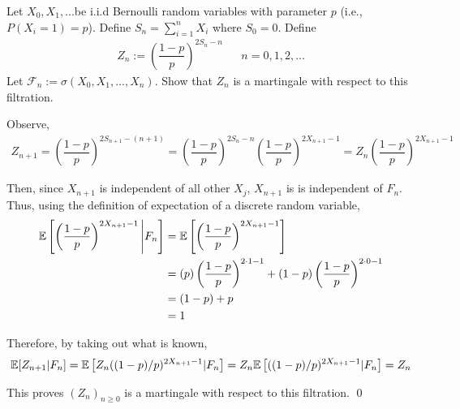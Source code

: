\documentclass[10pt]{article}
\begin{document}
\begin{problem}[Exercise 2.5]
Let \( X_0,X_1,... \)be i.i.d Bernoulli random variables with parameter \( p \) (i.e., \( P(X_i= 1) =p\)). Define \( S_n=\sum_{i=1}^{n}X_i \) where \( S_0=0 \). Define
\begin{align*}
    Z_n:=\left(\dfrac{1-p}{p}\right)^{2S_n-n} && n=0,1,2,...
\end{align*}
Let \( \mathcal{F}_n:=\sigma(X_0,X_1,...,X_n) \). Show that \( Z_n \) is a martingale with respect to this filtration.
\end{problem}

\begin{solution}[Solution]
Observe,
\begin{align*}
    Z_{n+1} = \left(\dfrac{1-p}{p}\right)^{2S_{n+1}-(n+1)} = \left(\dfrac{1-p}{p}\right)^{2S_n-n}\left(\dfrac{1-p}{p}\right)^{2X_{n+1}-1} = Z_n\left(\dfrac{1-p}{p}\right)^{2X_{n+1}-1} 
\end{align*}

Then, since \( X_{n+1} \) is independent of all other \( X_j \), \( X_{n+1} \) is is independent of \( F_n \). Thus, using the definition of expectation of a discrete random variable,
\begin{align*}
    \mathbb{E}\left[\left(\dfrac{1-p}{p}\right)^{2X_{n+1}-1} \Bigg| F_n \right] &= \mathbb{E}\left[\left(\dfrac{1-p}{p}\right)^{2X_{n+1}-1}\right] \\
    &= (p)\left(\dfrac{1-p}{p}\right)^{2\cdot 1-1}+(1-p)\left(\dfrac{1-p}{p}\right)^{2\cdot 0-1} \\
    &= (1-p)+p \\
    &=1
\end{align*}

Therefore, by taking out what is known,
\begin{align*}
    \mathbb{E}[Z_{n+1}|F_n] = \mathbb{E}\left[Z_n((1-p)/p)^{2X_{n+1}-1}|F_n\right] = Z_n\mathbb{E}\left[((1-p)/p)^{2X_{n+1}-1}|F_n\right] = Z_n
\end{align*}

This proves \( (Z_n)_{n\geq 0} \) is a martingale with respect to this filtration. \qed


\end{solution}
\end{document}

